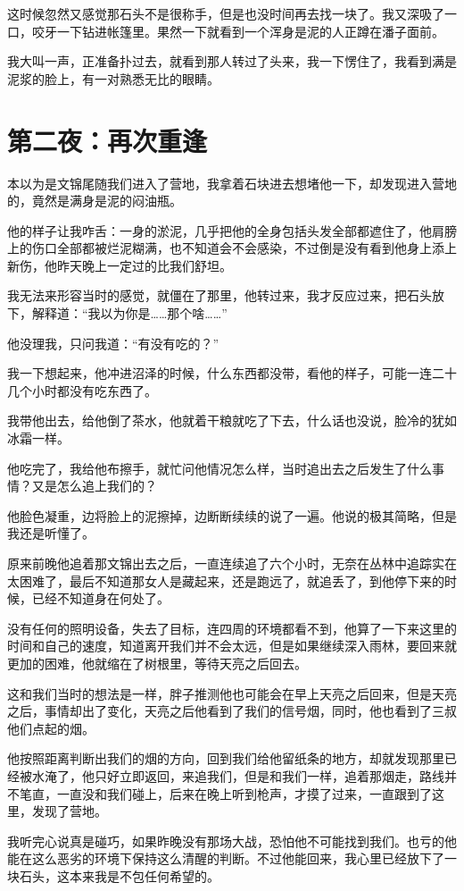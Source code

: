 这时候忽然又感觉那石头不是很称手，但是也没时间再去找一块了。我又深吸了一口，咬牙一下钻进帐篷里。果然一下就看到一个浑身是泥的人正蹲在潘子面前。

我大叫一声，正准备扑过去，就看到那人转过了头来，我一下愣住了，我看到满是泥浆的脸上，有一对熟悉无比的眼睛。

\chapter{第二夜：再次重逢}

本以为是文锦尾随我们进入了营地，我拿着石块进去想堵他一下，却发现进入营地的，竟然是满身是泥的闷油瓶。

他的样子让我咋舌：一身的淤泥，几乎把他的全身包括头发全部都遮住了，他肩膀上的伤口全部都被烂泥糊满，也不知道会不会感染，不过倒是没有看到他身上添上新伤，他昨天晚上一定过的比我们舒坦。

我无法来形容当时的感觉，就僵在了那里，他转过来，我才反应过来，把石头放下，解释道：“我以为你是……那个啥……”

他没理我，只问我道：“有没有吃的？”

我一下想起来，他冲进沼泽的时候，什么东西都没带，看他的样子，可能一连二十几个小时都没有吃东西了。

我带他出去，给他倒了茶水，他就着干粮就吃了下去，什么话也没说，脸冷的犹如冰霜一样。

他吃完了，我给他布擦手，就忙问他情况怎么样，当时追出去之后发生了什么事情？又是怎么追上我们的？

他脸色凝重，边将脸上的泥擦掉，边断断续续的说了一遍。他说的极其简略，但是我还是听懂了。

原来前晚他追着那文锦出去之后，一直连续追了六个小时，无奈在丛林中追踪实在太困难了，最后不知道那女人是藏起来，还是跑远了，就追丢了，到他停下来的时候，已经不知道身在何处了。

没有任何的照明设备，失去了目标，连四周的环境都看不到，他算了一下来这里的时间和自己的速度，知道离开我们并不会太远，但是如果继续深入雨林，要回来就更加的困难，他就缩在了树根里，等待天亮之后回去。

这和我们当时的想法是一样，胖子推测他也可能会在早上天亮之后回来，但是天亮之后，事情却出了变化，天亮之后他看到了我们的信号烟，同时，他也看到了三叔他们点起的烟。

他按照距离判断出我们的烟的方向，回到我们给他留纸条的地方，却就发现那里已经被水淹了，他只好立即返回，来追我们，但是和我们一样，追着那烟走，路线并不笔直，一直没和我们碰上，后来在晚上听到枪声，才摸了过来，一直跟到了这里，发现了营地。

我听完心说真是碰巧，如果昨晚没有那场大战，恐怕他不可能找到我们。也亏的他能在这么恶劣的环境下保持这么清醒的判断。不过他能回来，我心里已经放下了一块石头，这本来我是不包任何希望的。

